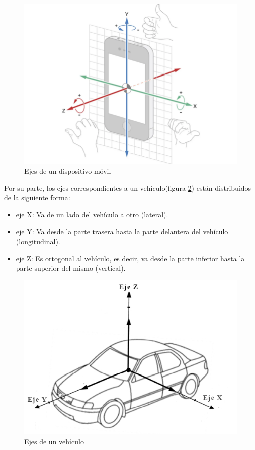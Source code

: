 	\begin{figure}[htb]
		\centering
		\includegraphics[scale = 0.4]{Graphics/mobile_phone_axis.png}
		\caption{Ejes de un dispositivo móvil}
		\label{fig:2}
	\end{figure}

	Por su parte, los ejes correspondientes a un vehículo(figura \ref{fig:3}) están distribuidos de la siguiente forma:

	\begin{itemize}
		\item eje X: Va de un lado del vehículo a otro (lateral).
		\item eje Y: Va desde la parte trasera hasta la parte delantera del vehículo (longitudinal).
		\item eje Z: Es ortogonal al vehículo, es decir, va desde la parte inferior hasta la parte superior del mismo (vertical).
	\end{itemize}

	\begin{figure}[htb]
		\centering
		\includegraphics[scale = 0.4]{Graphics/car-axis.jpg}
		\caption{Ejes de un vehículo}
		\label{fig:3}
	\end{figure}

